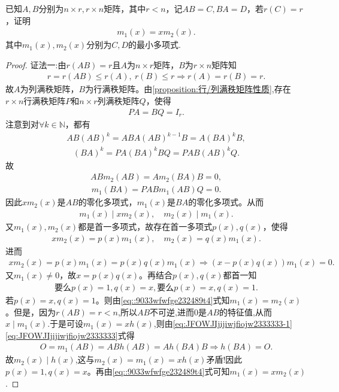 \documentclass[../../main.tex]{subfiles}%
\begin{document}
\begin{example}
已知$A,B$分别为$n \times r,r \times n$矩阵，其中$r < n$，记$AB=C,BA=D$，若$r(C)=r$，证明
\begin{align*}
m_1(x) = x m_2(x).
\end{align*}
其中$m_1(x),m_2(x)$分别为$C,D$的最小多项式.
\end{example}
\begin{proof}

{\color{blue}证法一:}由$r(AB) = r$且$A$为$n \times r$矩阵，$B$为$r \times n$矩阵知
\begin{align*}
r = r(AB) \leqslant r(A),\ r(B) \leqslant r \Longrightarrow r(A) = r(B) = r.
\end{align*}
故$A$为列满秩矩阵，$B$为行满秩矩阵。由\cref{proposition:行/列满秩矩阵性质},存在$r \times n$行满秩矩阵$P$和$n \times r$列满秩矩阵$Q$，使得
\begin{align}\label{eq:JFOWJIjijiwjfiojw2333333-1}
PA = BQ = I_r.
\end{align}
注意到对$\forall k \in \mathbb{N}$，都有
\begin{align}
AB(AB)^k = ABA(AB)^{k-1}B = A(BA)^kB,\label{eq:JFOWJIjijiwjfiojw2333333}
\end{align}
\begin{align*}
(BA)^k = PA(BA)^kBQ = PAB(AB)^kQ.
\end{align*}
故
\begin{align*}
ABm_2(AB) = Am_2(BA)B = 0,
\end{align*}
\begin{align*}
m_1(BA) = PABm_1(AB)Q = 0.
\end{align*}
因此$xm_2(x)$是$AB$的零化多项式，$m_1(x)$是$BA$的零化多项式。从而
\begin{align*}
m_1(x) \mid xm_2(x),\quad m_2(x) \mid m_1(x).
\end{align*}
又$m_1(x), m_2(x)$都是首一多项式，故存在首一多项式$p(x), q(x)$，使得
\begin{align}
xm_2(x) = p(x)m_1(x),\quad m_2(x) = q(x)m_1(x). \label{eq::9033wfwfge232489t4}
\end{align}
进而
\begin{align*}
xm_2(x) = p(x)m_1(x) = p(x)q(x)m_1(x) \Longrightarrow (x - p(x)q(x))m_1(x) = 0.
\end{align*}
又$m_1(x) \ne 0$，故$x = p(x)q(x)$。再结合$p(x), q(x)$都首一知
\begin{align*}
\text{要么}p(x)=1,q(x)=x,\text{要么}p(x)=x,q(x)=1.
\end{align*}
若$p(x) = x, q(x) = 1$。则由\eqref{eq::9033wfwfge232489t4}式知$m_1(x) = m_2(x)$。但是，因为$r(AB) = r < n$,所以$AB$不可逆,进而0是$AB$的特征值,从而$x\mid m_1(x)$.于是可设$m_1(x)=xh(x)$,则由\eqref{eq:JFOWJIjijiwjfiojw2333333-1}\eqref{eq:JFOWJIjijiwjfiojw2333333}式得
\begin{align*}
O=m_1(AB)=ABh(AB)=Ah(BA)B\Longrightarrow h(BA)=O.
\end{align*}
故$m_2(x)\mid h(x)$,这与$m_2(x)=m_1(x)=xh(x)$矛盾!因此$p(x) = 1, q(x) = x$。再由\eqref{eq::9033wfwfge232489t4}式可知$m_1(x) = xm_2(x)$.


\end{proof}
\end{document}
